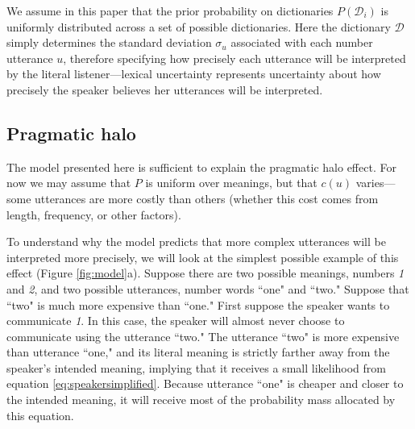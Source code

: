 \documentclass{article} %
\newcommand{\dictionary}{\ensuremath{\mathcal{D}}\xspace}
\begin{document}
We assume in this paper that the prior probability on dictionaries $P(\dictionary_i)$ is uniformly distributed across a set of possible dictionaries. 
Here the dictionary $\dictionary$ simply determines the standard deviation $\sigma_u$ associated with each number utterance $u$, therefore specifying how precisely each utterance will be interpreted by the literal listener---lexical uncertainty represents uncertainty about how precisely the speaker believes her utterances will be interpreted. 


\subsection{Pragmatic halo}

The model presented here is sufficient to explain the pragmatic halo effect. For now we may assume that $P$ is uniform over meanings, but that $c(u)$ varies---some utterances are more costly than others (whether this cost comes from length, frequency, or other factors).

To understand why the model predicts that more complex utterances will be interpreted more precisely, we will look at the simplest possible example of this effect (Figure \ref{fig:model}a). Suppose there are two possible meanings, numbers \emph{1} and \emph{2}, and two possible utterances, number words ``one" and ``two." Suppose that ``two" is much more expensive than ``one." First suppose the speaker wants to communicate \emph{1}. In this case, the speaker will almost never choose to communicate using the utterance ``two." The utterance ``two" is more expensive than utterance ``one," and its literal meaning is strictly farther away from the speaker's intended meaning, implying that it receives a small likelihood from equation \ref{eq:speakersimplified}. Because utterance ``one" is cheaper and closer to the intended meaning, it will receive most of the probability mass allocated by this equation.
\end{document}
